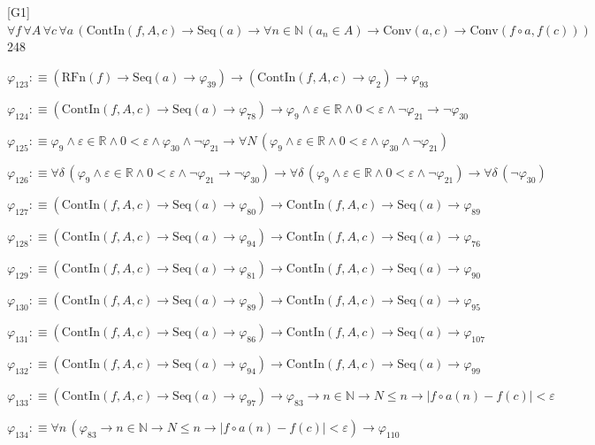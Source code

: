 \begin{fullproof}{[G1]}{$\forall f\,\forall A\,\forall c\,\forall a\,(\mathrm{ContIn}(f,A,c) \to \mathrm{Seq}(a) \to \forall n \in \mathbb{N}\,(a_{n} \in A) \to \mathrm{Conv}(a,c) \to \mathrm{Conv}(f \circ a,f(c)))$}{248}
\begin{abbrevlist}
\item $\varphi_{123} :\equiv (\mathrm{RFn}(f) \to \mathrm{Seq}(a) \to \varphi_{39}) \to (\mathrm{ContIn}(f,A,c) \to \varphi_{2}) \to \varphi_{93}$
\item $\varphi_{124} :\equiv (\mathrm{ContIn}(f,A,c) \to \mathrm{Seq}(a) \to \varphi_{78}) \to \varphi_{9} \land \varepsilon \in \mathbb{R} \land 0 < \varepsilon \land \neg \varphi_{21} \to \neg \varphi_{30}$
\item $\varphi_{125} :\equiv \varphi_{9} \land \varepsilon \in \mathbb{R} \land 0 < \varepsilon \land \varphi_{30} \land \neg \varphi_{21} \to \forall N\,(\varphi_{9} \land \varepsilon \in \mathbb{R} \land 0 < \varepsilon \land \varphi_{30} \land \neg \varphi_{21})$
\item $\varphi_{126} :\equiv \forall \delta\,(\varphi_{9} \land \varepsilon \in \mathbb{R} \land 0 < \varepsilon \land \neg \varphi_{21} \to \neg \varphi_{30}) \to \forall \delta\,(\varphi_{9} \land \varepsilon \in \mathbb{R} \land 0 < \varepsilon \land \neg \varphi_{21}) \to \forall \delta\,(\neg \varphi_{30})$
\item $\varphi_{127} :\equiv (\mathrm{ContIn}(f,A,c) \to \mathrm{Seq}(a) \to \varphi_{80}) \to \mathrm{ContIn}(f,A,c) \to \mathrm{Seq}(a) \to \varphi_{89}$
\item $\varphi_{128} :\equiv (\mathrm{ContIn}(f,A,c) \to \mathrm{Seq}(a) \to \varphi_{94}) \to \mathrm{ContIn}(f,A,c) \to \mathrm{Seq}(a) \to \varphi_{76}$
\item $\varphi_{129} :\equiv (\mathrm{ContIn}(f,A,c) \to \mathrm{Seq}(a) \to \varphi_{81}) \to \mathrm{ContIn}(f,A,c) \to \mathrm{Seq}(a) \to \varphi_{90}$
\item $\varphi_{130} :\equiv (\mathrm{ContIn}(f,A,c) \to \mathrm{Seq}(a) \to \varphi_{89}) \to \mathrm{ContIn}(f,A,c) \to \mathrm{Seq}(a) \to \varphi_{95}$
\item $\varphi_{131} :\equiv (\mathrm{ContIn}(f,A,c) \to \mathrm{Seq}(a) \to \varphi_{86}) \to \mathrm{ContIn}(f,A,c) \to \mathrm{Seq}(a) \to \varphi_{107}$
\item $\varphi_{132} :\equiv (\mathrm{ContIn}(f,A,c) \to \mathrm{Seq}(a) \to \varphi_{94}) \to \mathrm{ContIn}(f,A,c) \to \mathrm{Seq}(a) \to \varphi_{99}$
\item $\varphi_{133} :\equiv (\mathrm{ContIn}(f,A,c) \to \mathrm{Seq}(a) \to \varphi_{97}) \to \varphi_{83} \to n \in \mathbb{N} \to N \leq n \to \lvert f \circ a(n) - f(c) \rvert < \varepsilon$
\item $\varphi_{134} :\equiv \forall n\,(\varphi_{83} \to n \in \mathbb{N} \to N \leq n \to \lvert f \circ a(n) - f(c) \rvert < \varepsilon) \to \varphi_{110}$

\end{abbrevlist}
\end{fullproof}
